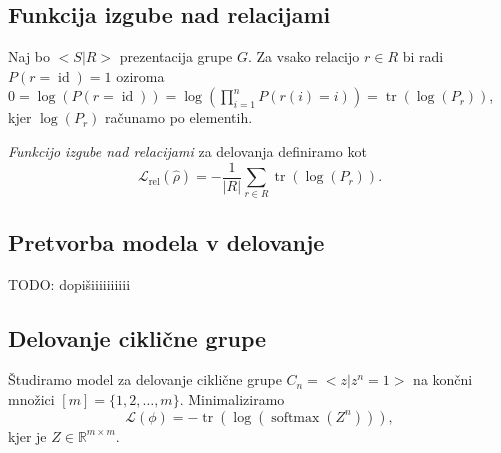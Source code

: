 \documentclass[mat2, tisk]{fmfdelo}
\newcommand{\TODO}[1]{{\color{blue} TODO: #1}}
\newcommand{\R}{\mathbb R}
\newcommand{\loss }{\mathcal L}
\newcommand{\Loss}[1]{\mathcal L _\text{#1}}
\begin{document}
              \subsection{Funkcija izgube nad relacijami}
              Naj bo $<S|R>$ prezentacija grupe $G$. Za vsako
              relacijo $r \in R$ bi radi $P(r = \operatorname{id})
              =1$ oziroma $0 = \log(P(r=\operatorname{id})) =
              \log(\prod_{i=1}^n P(r(i)=i)) =
              \operatorname{tr}(\log(P_r))$, kjer $\log(P_r)$
              računamo po elementih.
              \begin{definicija}
                \emph{Funkcijo izgube nad relacijami} za delovanja
                definiramo kot
                \begin{equation}
                  \label{eq:relation loss actions}
                  \Loss{rel} (\hat\rho) = - \frac{1}{|R|} \sum_{r \in
                  R} \operatorname{tr}(\log(P_r)).
                \end{equation}
              \end{definicija}
              \subsection{Pretvorba modela v delovanje}
              \TODO{dopišiiiiiiiiii}
              \subsection{Delovanje ciklične grupe}
              Študiramo model za delovanje ciklične grupe $C_n = <z |
              z^n=1>$ na končni množici $[m] = \{1,2,\dotsc, m\}$.
              Minimaliziramo
              $$
              \loss(\phi) = - \operatorname{tr}(\log
              \left(\operatorname{softmax}(Z^n) \right ) ),
              $$
              kjer je $Z \in \R^{m \times m}$.
\end{document}

